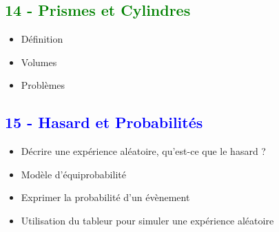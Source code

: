 \documentclass[12pt]{article}
\begin{document}
\begin{multicols}{2}
\subsection*{\textcolor{green}{14 - Prismes et Cylindres}}

\begin{itemize}
\item Définition
\item Volumes
\item Problèmes
\end{itemize}

\subsection*{\textcolor{blue}{15 - Hasard et Probabilités}}

\begin{itemize}
\item Décrire une expérience aléatoire, qu’est-ce que le hasard ?
\item Modèle d’équiprobabilité
\item Exprimer la probabilité d’un évènement
\item Utilisation du tableur pour simuler une expérience aléatoire
\end{itemize}

\end{multicols}
\end{document}
